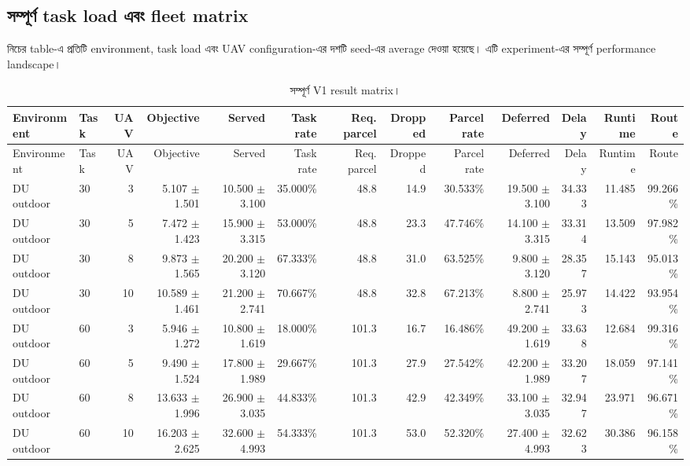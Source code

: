 \documentclass[10pt,a4paper]{article}
\begin{document}
\clearpage
\begin{landscape}
\subsection{সম্পূর্ণ task load এবং fleet matrix}

নিচের table-এ প্রতিটি environment, task load এবং UAV configuration-এর দশটি seed-এর average দেওয়া হয়েছে। এটি experiment-এর সম্পূর্ণ performance landscape।

\scriptsize
\begin{longtable}{@{}llrrrrrrrrrrr@{}}
\caption{সম্পূর্ণ V1 result matrix।}\label{tab:full-matrix-bn}\\
\toprule
Environment & Task & UAV & Objective & Served & Task rate & Req. parcel & Dropped & Parcel rate & Deferred & Delay & Runtime & Route \\
\midrule
\endfirsthead
\toprule
Environment & Task & UAV & Objective & Served & Task rate & Req. parcel & Dropped & Parcel rate & Deferred & Delay & Runtime & Route \\
\midrule
\endhead
DU outdoor & 30 & 3 & 5.107 $\pm$ 1.501 & 10.500 $\pm$ 3.100 & 35.000\% & 48.8 & 14.9 & 30.533\% & 19.500 $\pm$ 3.100 & 34.333 & 11.485 & 99.266\% \\
DU outdoor & 30 & 5 & 7.472 $\pm$ 1.423 & 15.900 $\pm$ 3.315 & 53.000\% & 48.8 & 23.3 & 47.746\% & 14.100 $\pm$ 3.315 & 33.314 & 13.509 & 97.982\% \\
DU outdoor & 30 & 8 & 9.873 $\pm$ 1.565 & 20.200 $\pm$ 3.120 & 67.333\% & 48.8 & 31.0 & 63.525\% & 9.800 $\pm$ 3.120 & 28.357 & 15.143 & 95.013\% \\
DU outdoor & 30 & 10 & 10.589 $\pm$ 1.461 & 21.200 $\pm$ 2.741 & 70.667\% & 48.8 & 32.8 & 67.213\% & 8.800 $\pm$ 2.741 & 25.973 & 14.422 & 93.954\% \\
DU outdoor & 60 & 3 & 5.946 $\pm$ 1.272 & 10.800 $\pm$ 1.619 & 18.000\% & 101.3 & 16.7 & 16.486\% & 49.200 $\pm$ 1.619 & 33.638 & 12.684 & 99.316\% \\
DU outdoor & 60 & 5 & 9.490 $\pm$ 1.524 & 17.800 $\pm$ 1.989 & 29.667\% & 101.3 & 27.9 & 27.542\% & 42.200 $\pm$ 1.989 & 33.207 & 18.059 & 97.141\% \\
DU outdoor & 60 & 8 & 13.633 $\pm$ 1.996 & 26.900 $\pm$ 3.035 & 44.833\% & 101.3 & 42.9 & 42.349\% & 33.100 $\pm$ 3.035 & 32.947 & 23.971 & 96.671\% \\
DU outdoor & 60 & 10 & 16.203 $\pm$ 2.625 & 32.600 $\pm$ 4.993 & 54.333\% & 101.3 & 53.0 & 52.320\% & 27.400 $\pm$ 4.993 & 32.623 & 30.386 & 96.158\% \\

\end{longtable}
\end{landscape}
\end{document}
